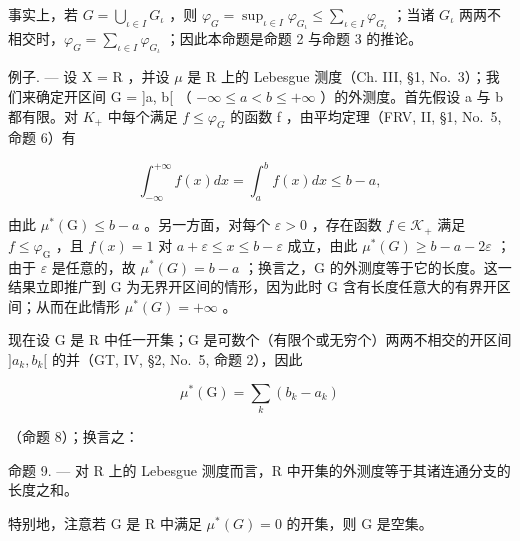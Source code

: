 事实上，若 \(G = \bigcup_{\iota \in I} G_{\iota}\) ，则 \(\varphi_{G} = \sup_{\iota \in I} \varphi_{G_{\iota}} \leqslant \sum_{\iota \in I} \varphi_{G_{\iota}}\) ；当诸 \(G_{\iota}\) 两两不相交时，\(\varphi_{G} = \sum_{\iota \in I} \varphi_{G_{\iota}}\) ；因此本命题是命题 2 与命题 3 的推论。

例子. --- 设 X = R ，并设 \(\mu\) 是 R 上的 Lebesgue 测度（Ch. III, §1, No.~3）；我们来确定开区间 G = {]}a, b{[} （ \(-\infty \leqslant a < b \leqslant +\infty\) ）的外测度。首先假设 a 与 b 都有限。对 \(K_{+}\) 中每个满足 \(f \leqslant \varphi_{G}\) 的函数 f ，由平均定理（FRV, II, §1, No.~5, 命题 6）有

\[
\int_ {- \infty} ^ {+ \infty} f (x) d x = \int_ {a} ^ {b} f (x) d x \leqslant b - a,
\]

由此 \(\mu^{*}(\mathrm{G})\leqslant b - a\) 。另一方面，对每个 \(\varepsilon >0\) ，存在函数 \(f\in \mathcal{K}_{+}\) 满足 \(f\leqslant \varphi_{\mathrm{G}}\) ，且 \(f(x) = 1\) 对 \(a + \varepsilon \leqslant x\leqslant b - \varepsilon\) 成立，由此 \(\mu^{*}(G) \geqslant b - a - 2\varepsilon\) ；由于 \(\varepsilon\) 是任意的，故 \(\mu^{*}(G) = b - a\) ；换言之，G 的外测度等于它的长度。这一结果立即推广到 G 为无界开区间的情形，因为此时 G 含有长度任意大的有界开区间；从而在此情形 \(\mu^{*}(G) = +\infty\) 。

现在设 G 是 R 中任一开集；G 是可数个（有限个或无穷个）两两不相交的开区间 \({]}a_{k}, b_{k}{[}\) 的并（GT, IV, §2, No.~5, 命题 2），因此

\[
\mu^ {*} (\mathrm{G}) = \sum_ {k} (b _ {k} - a _ {k})
\]

（命题 8）；换言之：

命题 9. --- 对 R 上的 Lebesgue 测度而言，R 中开集的外测度等于其诸连通分支的长度之和。

特别地，注意若 G 是 R 中满足 \(\mu^{*}(G)=0\) 的开集，则 G 是空集。

